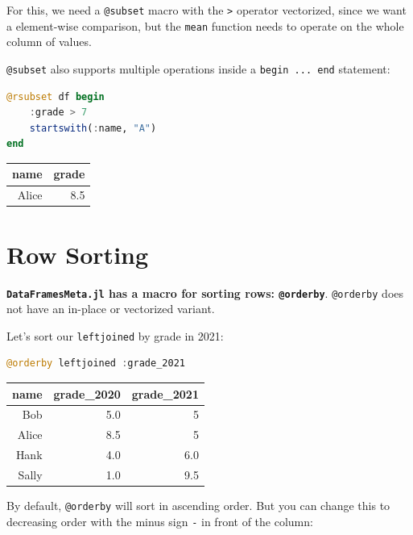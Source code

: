 \documentclass[
  notoc %
]{tufte-book}
\newcommand{\passthrough}[1]{#1}
\begin{document}
For this, we need a \passthrough{\lstinline!@subset!} macro with the
\passthrough{\lstinline!>!} operator vectorized, since we want a
element-wise comparison, but the \passthrough{\lstinline!mean!} function
needs to operate on the whole column of values.

\passthrough{\lstinline!@subset!} also supports multiple operations
inside a \passthrough{\lstinline!begin ... end!} statement:

\begin{lstlisting}[language=Julia]
@rsubset df begin
    :grade > 7
    startswith(:name, "A")
end
\end{lstlisting}

\begin{longtable}[]{@{}rr@{}}
\toprule()
name & grade \\
\midrule()
\endhead
Alice & 8.5 \\
\bottomrule()
\end{longtable}

\hypertarget{sec:dataframesmeta_orderby}{%
\section{Row Sorting}\label{sec:dataframesmeta_orderby}}

\textbf{\passthrough{\lstinline!DataFramesMeta.jl!} has a macro for
sorting rows: \passthrough{\lstinline!@orderby!}}.
\passthrough{\lstinline!@orderby!} does not have an in-place or
vectorized variant.

Let's sort our \passthrough{\lstinline!leftjoined!} by grade in 2021:

\begin{lstlisting}[language=Julia]
@orderby leftjoined :grade_2021
\end{lstlisting}

\begin{longtable}[]{@{}rrr@{}}
\toprule()
name & grade\_2020 & grade\_2021 \\
\midrule()
\endhead
Bob & 5.0 & 5 \\
Alice & 8.5 & 5 \\
Hank & 4.0 & 6.0 \\
Sally & 1.0 & 9.5 \\
\bottomrule()
\end{longtable}

By default, \passthrough{\lstinline!@orderby!} will sort in ascending
order. But you can change this to decreasing order with the minus sign
\passthrough{\lstinline!-!} in front of the column:
\end{document}
